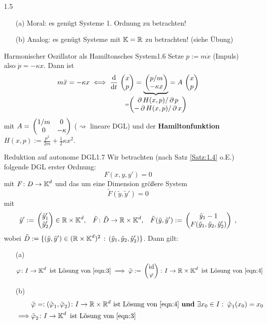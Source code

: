 \documentclass[a4paper]{article}
\begin{document}
\begin{Bemerkung}{}{1.5}
\begin{itemize}
    \item[(a)] Moral: es genügt Systeme 1. Ordnung zu betrachten!
    \item[(b)] Analog: es genügt Systeme mit $\operatorname{\mathbb K}=\mathbb R$ zu betrachten! (siehe Übung)
\end{itemize}
\end{Bemerkung}

\begin{Beispiel}{Harmonischer Oszillator als Hamiltonsches System}{1.6}
Setze $p:=m\dot{x}$ (Impuls) also $\dot{p}=-\kappa x$. Dann ist
\[m\ddot{x}=-\kappa x\iff\frac{\dd}{\dd t}\vv{x\\p}=\underbrace{\vv{p/m\\-\kappa x}}_{\mathclap{=\vv{\pp H(x,p)/\pp p\\-\pp H(x,p)/\pp x}}}=A\vv{x\\p}\]
mit $A=\mathop{}\begin{pmatrix}1/m&0\\0&-\kappa\end{pmatrix}$ ($\rightsquigarrow$ lineare DGL) und der \textbf{Hamiltonfunktion} $H(x,p):=\frac{p^2}{2m}+\frac{1}{2}\kappa x^2$.
\end{Beispiel}


\begin{Satz}{Reduktion auf autonome DGL}{1.7}
Wir betrachten (nach Satz \ref{Satz:1.4} o.E.) folgende DGL erster Ordnung:
\[
    F(x,y,y')=0\tag{$1$}\label{eqn:3}
\]
mit $F\colon D\to\operatorname{\mathbb K}^d$ und das um eine Dimension größere System
\[
    \tilde{F}(\tilde{y},\tilde{y}')=0\tag{$2$}\label{eqn:4}
\]
mit
\[\tilde{y}':=\mathop{}\begin{pmatrix}\tilde{y}_1'\\\tilde{y}_2'\end{pmatrix}\in\mathbb R\times \operatorname{\mathbb K}^d,\;\;\;\tilde{F}\colon \tilde{D}\to \mathbb R\times \operatorname{\mathbb K}^d,\;\;\; \tilde{F}(\tilde{y},\tilde{y}'):=\mathop{}\begin{pmatrix}\tilde{y}_1-1\\ F(\tilde{y}_1,\tilde{y}_2,\tilde{y}_2')\end{pmatrix}\;,\]
wobei $\tilde{D}:=\{(\tilde{y},\tilde{y}')\in (\mathbb R\times \operatorname{\mathbb K}^d)^2\,:\,(\tilde{y}_1,\tilde{y}_2,\tilde{y}_2')\}$.
Dann gilt:
\begin{itemize}
    \item[(a)] 
    \[\operatorname{\varphi}\colon I\to \operatorname{\mathbb K}^d\text{ ist Lösung von \eqref{eqn:3}}\implies \tilde{\operatorname{\varphi}}:=\mathop{}\begin{pmatrix}\operatorname{\mathrm{id}}\\\operatorname{\varphi}\end{pmatrix}\colon I\to\mathbb R\times \operatorname{\mathbb K}^d\text{ ist Lösung von \eqref{eqn:4}}\]
    
    \item[(b)] 
    \begin{align*}
    &\tilde{\operatorname{\varphi}}=:(\tilde{\operatorname{\varphi}}_1,\tilde{\operatorname{\varphi}}_2)\colon I\to\mathbb R\times \mathbb R^d\text{ ist Lösung von \eqref{eqn:4} \textbf{und} }\exists x_0\in I:\; \tilde{\operatorname{\varphi}}_1(x_0)=x_0\\\implies& \tilde{\operatorname{\varphi}}_2\colon I\to \operatorname{\mathbb K}^d\text{ ist Lösung von \eqref{eqn:3}}
    \end{align*}
\end{itemize}
\end{Satz}
\end{document}
